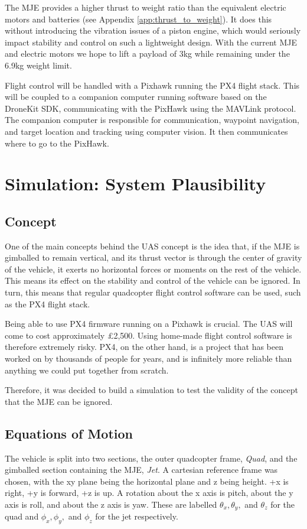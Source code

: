 \documentclass[10pt]{article}
\begin{document}
The MJE provides a higher thrust to weight ratio than the equivalent electric motors and batteries (see Appendix \ref{app:thrust_to_weight}). It does this without introducing the vibration issues of a piston engine, which would seriously impact stability and control on such a lightweight design. With the current MJE and electric motors we hope to lift a payload of 3kg while remaining under the 6.9kg weight limit.

Flight control will be handled with a Pixhawk running the PX4 flight stack. This will be coupled to a companion computer running software based on the DroneKit SDK, communicating with the PixHawk using the MAVLink protocol. The companion computer is responsible for communication, waypoint navigation, and target location and tracking using computer vision. It then communicates where to go to the PixHawk.

\section{Simulation: System Plausibility}
\subsection{Concept}
One of the main concepts behind the UAS concept is the idea that, if the MJE is gimballed to remain vertical, and its thrust vector is through the center of gravity of the vehicle, it exerts no horizontal forces or moments on the rest of the vehicle. This means its effect on the stability and control of the vehicle can be ignored. In turn, this means that regular quadcopter flight control software can be used, such as the PX4 flight stack.

Being able to use PX4 firmware running on a Pixhawk is crucial. The UAS will come to cost approximately \pounds2,500. Using home-made flight control software is therefore extremely risky. PX4, on the other hand, is a project that has been worked on by thousands of people for years, and is infinitely more reliable than anything we could put together from scratch.

Therefore, it was decided to build a simulation to test the validity of the concept that the MJE can be ignored.

\subsection{Equations of Motion}
The vehicle is split into two sections, the outer quadcopter frame, \emph{Quad}, and the gimballed section containing the MJE, \emph{Jet}. A cartesian reference frame was chosen, with the xy plane being the horizontal plane and z being height. +x is right, +y is forward, +z is up. A rotation about the x axis is pitch, about the y axis is roll, and about the z axis is yaw. These are labelled $\theta_x, \theta_y,$ and $\theta_z$ for the quad and $\phi_x, \phi_y,$ and $\phi_z$ for the jet respectively.
\end{document}
